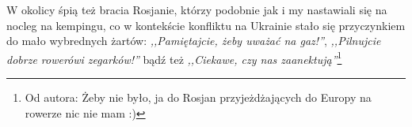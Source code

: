 {W okolicy śpią też bracia Rosjanie, którzy podobnie jak i my nastawiali się na nocleg na kempingu, co w kontekście konfliktu na Ukrainie stało się przyczynkiem do mało wybrednych żartów: \emph{,,Pamiętajcie, żeby uważać na gaz!''}}, \emph{,,Pilnujcie dobrze rowerów\textellipsis i zegarków!''} bądź też \emph{,,Ciekawe, czy nas zaanektują\textellipsis''}\footnote{Od autora: Żeby nie było, ja do Rosjan przyjeżdżających do Europy na rowerze nic nie mam :)}